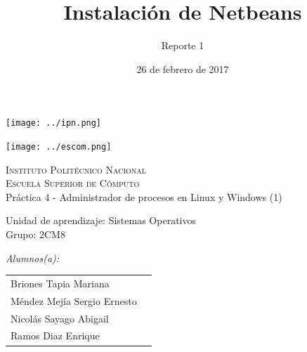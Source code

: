 \documentclass[12pt]{article}
\date{26 de febrero de 2017}
\title{Instalación de Netbeans}
\author{Reporte 1}
\begin{document}
        \begin{titlepage}
            \begin{center}
                
                
                \noindent
                \begin{minipage}{0.5\textwidth}
                    \begin{flushleft} \large
                        \texttt{[image: ../ipn.png]}
                    \end{flushleft}
                \end{minipage}%
                \begin{minipage}{0.55\textwidth}
                    \begin{flushright} \large
                        \texttt{[image: ../escom.png]}
                    \end{flushright}
                \end{minipage}
                
                \textsc{\LARGE Instituto Politécnico Nacional}\\[0.5cm]
                
                \textsc{\Large Escuela Superior de Cómputo}\\[1cm]
                
                
                { \huge Práctica 4 - Administrador de procesos en Linux y Windows (1) \\[1cm] }
                
                { \Large Unidad de aprendizaje: Sistemas Operativos} \\[1cm]
                
                { \Large Grupo: 2CM8 } \\[1cm]
                
                \noindent
                \begin{minipage}{0.5\textwidth}
                    \begin{flushleft} \large
                        \emph{Alumnos(a):}\\
                        
                        \begin{tabular}{ll}
                         Briones Tapia Mariana \\
                         Méndez Mejía Sergio Ernesto \\
                         Nicolás Sayago Abigail\\
                         Ramos Diaz Enrique \\
                         

\end{tabular}
\end{flushleft}
\end{minipage}
\end{center}
\end{titlepage}
\end{document}
